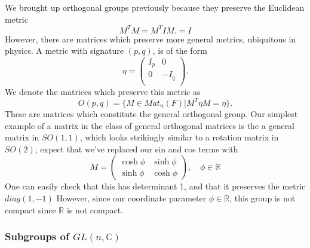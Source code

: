 \documentclass[11pt, oneside]{article}   	%
\theoremstyle{slanted}
\begin{document}
We brought up orthogonal groups previously because they preserve the Euclidean metric
\[ 
	M^T M  = M^T I M. = I 
\] 
 However, there are matrices which preserve more general metrics, ubiquitous in physics. A metric with signature $(p, q)$, is of the form 
\[
	\eta = \begin{pmatrix}
		I_p & 0 \\
		0 & - I_q \\
	\end{pmatrix}. 
\]
We denote the matrices which preserve this metric as 
\[
	O(p, q) = \{ M \in Mat_n(F) | M^T \eta M = \eta  \} . 
\]
These are matrices which constitute the general orthogonal group. Our simplest example of a matrix in the class of general orthogonal matrices is the a general matrix in $SO(1,1)$, which looks strikingly similar to a rotation matrix in $SO(2)$, expect that we've replaced our sin and cos terms with 
\[ 	
	M  = \begin{pmatrix} 
		\cosh \phi & \sinh \phi \\
		\sinh \phi & \cosh \phi 
	\end{pmatrix}, \quad \phi \in \mathbb{R} 
\] 
One can easily check that this has determinant 1, and that it preserves the metric $diag ( 1, - 1)$ However, since our coordinate parameter $\phi \in \mathbb{R} $, this group is not compact since $\mathbb{R}$ is not compact. 


\subsubsection{Subgroups of $GL(n, \mathbb{ C}) $}
\end{document}
